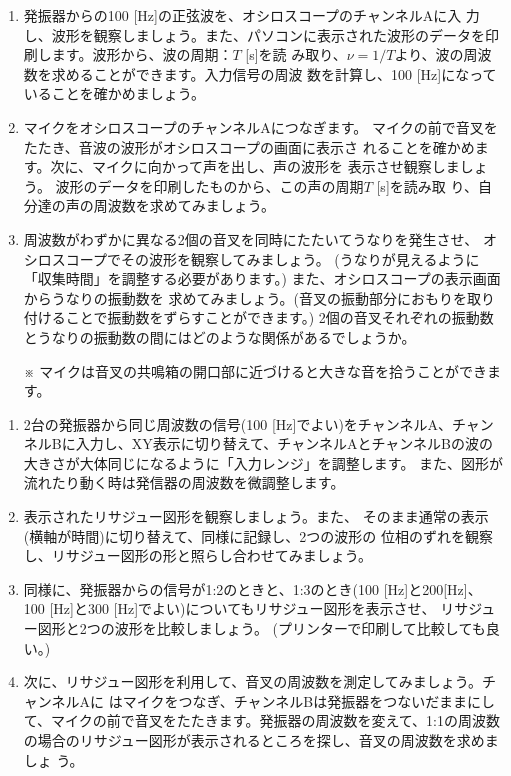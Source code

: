\begin{enumerate}

\item 発振器からの100 [Hz]の正弦波を、オシロスコープのチャンネルAに入
力し、波形を観察しましょう。また、パソコンに表示された波形のデータを印刷します。波形から、波の周期：$T$ [s]を読
み取り、$\nu=1/T$より、波の周波数を求めることができます。入力信号の周波
数を計算し、100 [Hz]になっていることを確かめましょう。

\item マイクをオシロスコープのチャンネルAにつなぎます。
マイクの前で音叉をたたき、音波の波形がオシロスコープの画面に表示さ
れることを確かめます。次に、マイクに向かって声を出し、声の波形を
表示させ観察しましょう。
波形のデータを印刷したものから、この声の周期$T$ [s]を読み取
り、自分達の声の周波数を求めてみましょう。

\item 周波数がわずかに異なる2個の音叉を同時にたたいてうなりを発生させ、
オシロスコープでその波形を観察してみましょう。
(うなりが見えるように「収集時間」を調整する必要があります。)
また、オシロスコープの表示画面からうなりの振動数を
求めてみましょう。(音叉の振動部分におもりを取り付けることで振動数をずらすことができます。)
2個の音叉それぞれの振動数とうなりの振動数の間にはどのような関係があるでしょうか。

※ マイクは音叉の共鳴箱の開口部に近づけると大きな音を拾うことができます。

\end{enumerate}



\begin{enumerate}

\item 2台の発振器から同じ周波数の信号(100 [Hz]でよい)をチャンネルA、チャンネルBに入力し、XY表示に切り替えて、チャンネルAとチャンネルBの波の大きさが大体同じになるように「入力レンジ」を調整します。
また、図形が流れたり動く時は発信器の周波数を微調整します。

\item 表示されたリサジュー図形を観察しましょう。また、
そのまま通常の表示(横軸が時間)に切り替えて、同様に記録し、2つの波形の
位相のずれを観察し、リサジュー図形の形と照らし合わせてみましょう。

\item 同様に、発振器からの信号が1:2のときと、1:3のとき(100 [Hz]と200[Hz]、 
100 [Hz]と300 [Hz]でよい)についてもリサジュー図形を表示させ、
リサジュー図形と2つの波形を比較しましょう。
(プリンターで印刷して比較しても良い。)

\item 次に、リサジュー図形を利用して、音叉の周波数を測定してみましょう。チャンネルAに
はマイクをつなぎ、チャンネルBは発振器をつないだままにし
て、マイクの前で音叉をたたきます。発振器の周波数を変えて、1:1の周波数
の場合のリサジュー図形が表示されるところを探し、音叉の周波数を求めましょ
う。


\end{enumerate}

